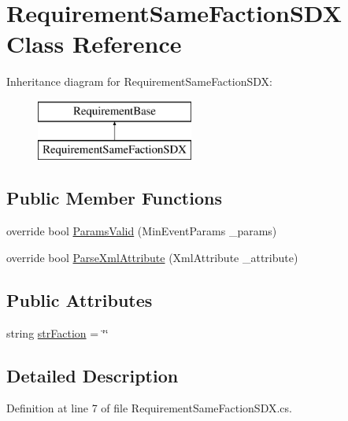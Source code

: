 \hypertarget{class_requirement_same_faction_s_d_x}{}\section{Requirement\+Same\+Faction\+S\+DX Class Reference}
\label{class_requirement_same_faction_s_d_x}
Inheritance diagram for Requirement\+Same\+Faction\+S\+DX\+:\begin{figure}[H]
\begin{center}
\leavevmode
\includegraphics[height=2.000000cm]{class_requirement_same_faction_s_d_x}
\end{center}
\end{figure}
\subsection*{Public Member Functions}
\begin{DoxyCompactItemize}
\item 
override bool \mbox{\hyperlink{class_requirement_same_faction_s_d_x_a20ff46c575dc2f656a3b5118f3b408c4}{Params\+Valid}} (Min\+Event\+Params \+\_\+params)
\item 
override bool \mbox{\hyperlink{class_requirement_same_faction_s_d_x_a28642bcc34d76d4f0fab111cf977bf64}{Parse\+Xml\+Attribute}} (Xml\+Attribute \+\_\+attribute)
\end{DoxyCompactItemize}
\subsection*{Public Attributes}
\begin{DoxyCompactItemize}
\item 
string \mbox{\hyperlink{class_requirement_same_faction_s_d_x_ab7f842920d0534c80a83f9da70b7fbd8}{str\+Faction}} = \char`\"{}\char`\"{}
\end{DoxyCompactItemize}


\subsection{Detailed Description}


Definition at line 7 of file Requirement\+Same\+Faction\+S\+D\+X.\+cs.




